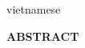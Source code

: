 \begin{titlepage}
\begin{otherlanguage*}{vietnamese}

\begin{center}
    \fontsize{18}{18}\textbf{ABSTRACT}
\end{center}

\end{otherlanguage*}
\vfill
\end{titlepage}